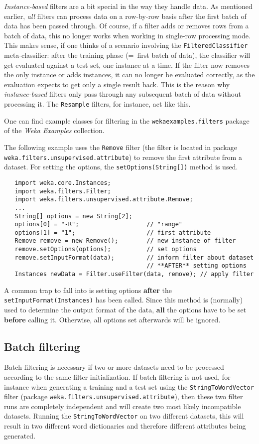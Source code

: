 \textit{Instance-based} filters are a bit special in the way they handle data.
As mentioned earlier, \textit{all} filters can process data on a row-by-row
basis after the first batch of data has been passed through. Of course, if a
filter adds or removes rows from a batch of data, this no longer works when
working in single-row processing mode. This makes sense, if one thinks of a
scenario involving the \texttt{FilteredClassifier} meta-classifier: after
the training phase (=\ first batch of data), the classifier will get
evaluated against a test set, one instance at a time. If the filter now
removes the only instance or adds instances, it can no longer be evaluated
correctly, as the evaluation expects to get only a single result back. This is
the reason why \textit{instance-based} filters only pass through any subsequent
batch of data without processing it. The \texttt{Resample} filters, for
instance, act like this.

One can find example classes for filtering in the \texttt{wekaexamples.filters}
package of the \textit{Weka Examples} collection\cite{wekaexamples}.

\newpage

The following example uses the \texttt{Remove} filter (the filter is located
in package \texttt{weka.filters.unsupervised.attribute}) to remove the
first attribute from a dataset. For setting the options, the
\texttt{setOptions(String[])} method is used.
\begin{verbatim}
   import weka.core.Instances;
   import weka.filters.Filter;
   import weka.filters.unsupervised.attribute.Remove;
   ...
   String[] options = new String[2];
   options[0] = "-R";                   // "range"
   options[1] = "1";                    // first attribute
   Remove remove = new Remove();        // new instance of filter
   remove.setOptions(options);          // set options
   remove.setInputFormat(data);         // inform filter about dataset
                                        // **AFTER** setting options
   Instances newData = Filter.useFilter(data, remove); // apply filter
\end{verbatim}
A common trap to fall into is setting options \textbf{after} the
\texttt{setInputFormat(Instances)} has been called. Since this method
is (normally) used to determine the output format of the data, \textbf{all} the
options have to be set \textbf{before} calling it. Otherwise, all options set
afterwards will be ignored.

\subsection{Batch filtering}
Batch filtering is necessary if two or more datasets need to be processed
according to the same filter initialization. If batch filtering is not used, 
for instance when generating a training and a test set using the
\texttt{StringToWordVector} filter (package
\texttt{weka.filters.unsupervised.attribute}), then these two filter runs are
 completely independent and will create two most likely incompatible datasets.
Running the \texttt{StringToWordVector} on two different datasets, this will
result in two different word dictionaries and therefore different attributes
being generated.

